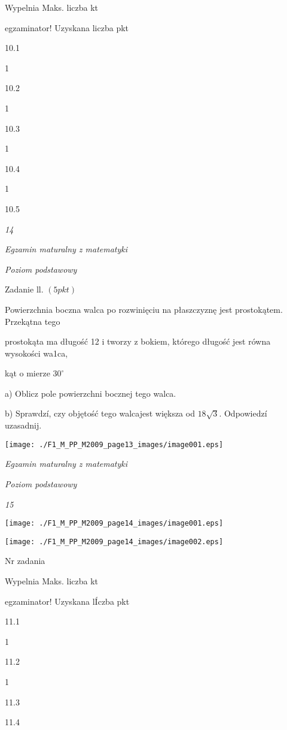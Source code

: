 \documentclass[a4paper,12pt]{article}
\begin{document}
Wypelnia Maks. liczba kt

egzaminator! Uzyskana liczba pkt

10.1

1

10.2

1

10.3

1

10.4

1

10.5





{\it 14}

{\it Egzamin maturalny z matematyki}

{\it Poziom podstawowy}

Zadanie ll. $(5pkt)$

Powierzchnia boczna walca po rozwinięciu na płaszczyznę jest prostokątem. Przekątna tego

prostokąta ma długość 12 i tworzy z bokiem, którego długość jest równa wysokości wa1ca,

kąt o mierze $30^{\circ}$

a) Oblicz pole powierzchni bocznej tego walca.

b) Sprawdzí, czy objętość tego walcajest większa od $18\sqrt{3}$. Odpowiedzí uzasadnij.
\begin{center}
\texttt{[image: ./F1\_M\_PP\_M2009\_page13\_images/image001.eps]}
\end{center}




{\it Egzamin maturalny z matematyki}

{\it Poziom podstawowy}

{\it 15}
\begin{center}
\texttt{[image: ./F1\_M\_PP\_M2009\_page14\_images/image001.eps]}

\texttt{[image: ./F1\_M\_PP\_M2009\_page14\_images/image002.eps]}
\end{center}
Nr zadania

Wypelnia Maks. liczba kt

egzaminator! Uzyskana lÍczba pkt

11.1

1

11.2

1

11.3

11.4
\end{document}
